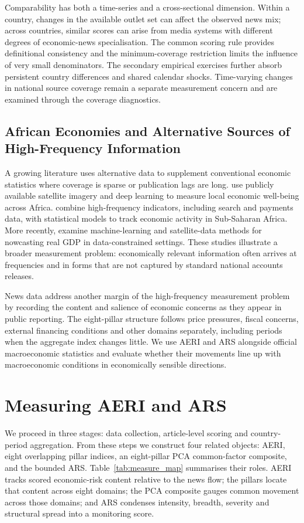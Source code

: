 \documentclass[12pt]{article}
\begin{document}
Comparability has both a time-series and a cross-sectional dimension. Within a country, changes in the available outlet set can affect the observed news mix; across countries, similar scores can arise from media systems with different degrees of economic-news specialisation. The common scoring rule provides definitional consistency and the minimum-coverage restriction limits the influence of very small denominators. The secondary empirical exercises further absorb persistent country differences and shared calendar shocks. Time-varying changes in national source coverage remain a separate measurement concern and are examined through the coverage diagnostics.
\subsection{African Economies and Alternative Sources of High-Frequency Information}
A growing literature uses alternative data to supplement conventional economic statistics where coverage is sparse or publication lags are long. \citet{yeh2020} use publicly available satellite imagery and deep learning to measure local economic well-being across Africa. \citet{buell2021} combine high-frequency indicators, including search and payments data, with statistical models to track economic activity in Sub-Saharan Africa. More recently, \citet{fotopoulou2026} examine machine-learning and satellite-data methods for nowcasting real GDP in data-constrained settings. These studies illustrate a broader measurement problem: economically relevant information often arrives at frequencies and in forms that are not captured by standard national accounts releases.

News data address another margin of the high-frequency measurement problem by recording the content and salience of economic concerns as they appear in public reporting. The eight-pillar structure follows price pressures, fiscal concerns, external financing conditions and other domains separately, including periods when the aggregate index changes little. We use AERI and ARS alongside official macroeconomic statistics and evaluate whether their movements line up with macroeconomic conditions in economically sensible directions.
\section{Measuring AERI and ARS}\label{sec:methodology}
We proceed in three stages: data collection, article-level scoring and country-period aggregation. From these steps we construct four related objects: AERI, eight overlapping pillar indices, an eight-pillar PCA common-factor composite, and the bounded ARS. Table~\ref{tab:measure_map} summarises their roles. AERI tracks scored economic-risk content relative to the news flow; the pillars locate that content across eight domains; the PCA composite gauges common movement across those domains; and ARS condenses intensity, breadth, severity and structural spread into a monitoring score.

\end{document}
